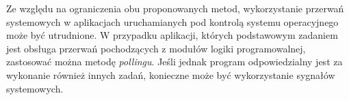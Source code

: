 Ze względu na ograniczenia obu proponowanych metod, wykorzystanie przerwań systemowych w aplikacjach uruchamianych pod kontrolą systemu operacyjnego może być utrudnione. W przypadku aplikacji, których podstawowym zadaniem jest obsługa przerwań pochodzących z modułów logiki programowalnej, zastosować można metodę \emph{pollingu}. Jeśli jednak program odpowiedzialny jest za wykonanie również innych zadań, konieczne może być wykorzystanie sygnałów systemowych.


